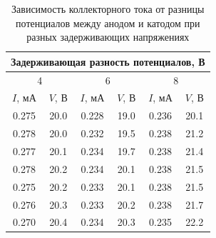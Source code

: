 
\begin{table}[]
\centering
\caption{Зависимость коллекторного тока от разницы потенциалов между анодом и катодом при разных задерживающих напряжениях}
\label{tab:my-table}
\begin{tabular}{|cccccc}
\hline
\multicolumn{6}{|c|}{\cellcolor[HTML]{C6E0B4}Задерживающая   разность потенциалов, В}                                                                                                           \\ \hline
\multicolumn{2}{|c|}{4}                                       & \multicolumn{2}{c|}{6}                                         & \multicolumn{2}{c|}{8}                                         \\ \hline
\multicolumn{1}{|c|}{$I$, мА} & \multicolumn{1}{c|}{$V$,   В} & \multicolumn{1}{c|}{$I$,   мА} & \multicolumn{1}{c|}{$V$,   В} & \multicolumn{1}{c|}{$I$,   мА} & \multicolumn{1}{c|}{$V$,   В} \\ \hline
\multicolumn{1}{|c|}{0.275}   & \multicolumn{1}{c|}{20.0}     & \multicolumn{1}{c|}{0.228}     & \multicolumn{1}{c|}{19.0}     & \multicolumn{1}{c|}{0.236}     & \multicolumn{1}{c|}{20.1}     \\ \hline
\multicolumn{1}{|c|}{0.278}   & \multicolumn{1}{c|}{20.0}     & \multicolumn{1}{c|}{0.232}     & \multicolumn{1}{c|}{19.5}     & \multicolumn{1}{c|}{0.238}     & \multicolumn{1}{c|}{21.2}     \\ \hline
\multicolumn{1}{|c|}{0.277}   & \multicolumn{1}{c|}{20.1}     & \multicolumn{1}{c|}{0.234}     & \multicolumn{1}{c|}{19.7}     & \multicolumn{1}{c|}{0.238}     & \multicolumn{1}{c|}{21.4}     \\ \hline
\multicolumn{1}{|c|}{0.278}   & \multicolumn{1}{c|}{20.2}     & \multicolumn{1}{c|}{0.234}     & \multicolumn{1}{c|}{20.1}     & \multicolumn{1}{c|}{0.238}     & \multicolumn{1}{c|}{21.5}     \\ \hline
\multicolumn{1}{|c|}{0.275}   & \multicolumn{1}{c|}{20.2}     & \multicolumn{1}{c|}{0.233}     & \multicolumn{1}{c|}{20.1}     & \multicolumn{1}{c|}{0.238}     & \multicolumn{1}{c|}{21.5}     \\ \hline
\multicolumn{1}{|c|}{0.276}   & \multicolumn{1}{c|}{20.3}     & \multicolumn{1}{c|}{0.233}     & \multicolumn{1}{c|}{20.2}     & \multicolumn{1}{c|}{0.238}     & \multicolumn{1}{c|}{21.7}     \\ \hline
\multicolumn{1}{|c|}{0.270}   & \multicolumn{1}{c|}{20.4}     & \multicolumn{1}{c|}{0.234}     & \multicolumn{1}{c|}{20.3}     & \multicolumn{1}{c|}{0.235}     & \multicolumn{1}{c|}{22.2}     \\ \hline

\end{tabular}
\end{table}
